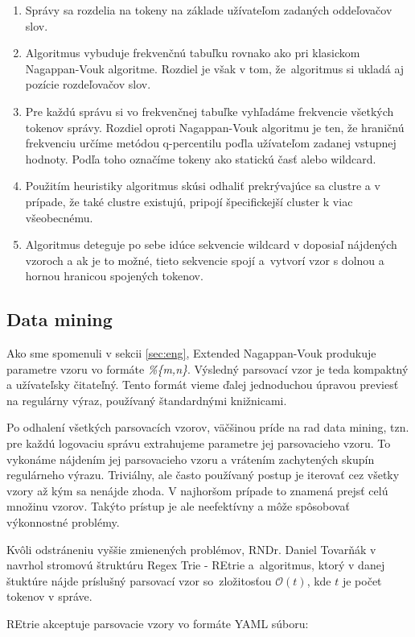 \begin{enumerate}
 \item Správy sa rozdelia na tokeny na základe užívateľom zadaných oddeľovačov slov.
 \item Algoritmus vybuduje frekvenčnú tabuľku rovnako ako pri klasickom Nagappan-Vouk algoritme. Rozdiel je však v tom, že~algoritmus si ukladá aj pozície rozdeľovačov slov.
 \item Pre každú správu si vo frekvenčnej tabuľke vyhľadáme frekvencie všetkých tokenov správy. Rozdiel oproti Nagappan-Vouk algoritmu je ten, že hraničnú frekvenciu určíme metódou q-per\-centilu poďla užívateľom zadanej vstupnej hodnoty. Podľa toho označíme tokeny ako statickú časť alebo wildcard.
 \item Použitím heuristiky algoritmus skúsi odhaliť prekrývajúce sa clustre a v prípade, že také clustre existujú, pripojí špecifickejší cluster k viac všeobecnému.
 \item Algoritmus deteguje po sebe idúce sekvencie wildcard v doposiaľ nájdených vzoroch a ak je to možné, tieto sekvencie spojí a~vytvorí
 vzor s dolnou a hornou hranicou spojených tokenov.
\end{enumerate}

\subsection{Data mining}
\label{sec:data-mining}
Ako sme spomenuli v sekcii \ref{sec:eng}, Extended Nagappan-Vouk produkuje parametre vzoru vo formáte \emph{\%\{m,n\}}. Výsledný parsovací vzor je teda kompaktný a užívateľsky čitateľný.  Tento formát vieme ďalej jednoduchou úpravou previesť na regulárny výraz, používaný štandardnými knižnicami.
\par Po odhalení všetkých parsovacích vzorov, väčšinou príde na rad data mining, tzn. pre každú logovaciu správu extrahujeme parametre jej parsovacieho vzoru. To vykonáme nájdením jej parsovacieho vzoru a vrátením zachytených skupín regulárneho výrazu. Triviálny, ale často používaný postup je iterovať cez všetky vzory až kým sa nenájde zhoda. V najhoršom prípade to znamená prejsť celú množinu vzorov. Takýto prístup je ale neefektívny a môže spôsobovať výkonnostné problémy. 
\par Kvôli odstráneniu vyššie zmienených problémov, RNDr. Daniel Tovarňák v \parencite{regextrie} navrhol stromovú štruktúru Regex Trie - REtrie a~algoritmus, ktorý v danej štuktúre nájde príslušný parsovací vzor so~zložitosťou $\mathcal{O}(t)$, kde $t$ je počet tokenov v správe. 
\par REtrie akceptuje parsovacie vzory vo formáte YAML súboru:

